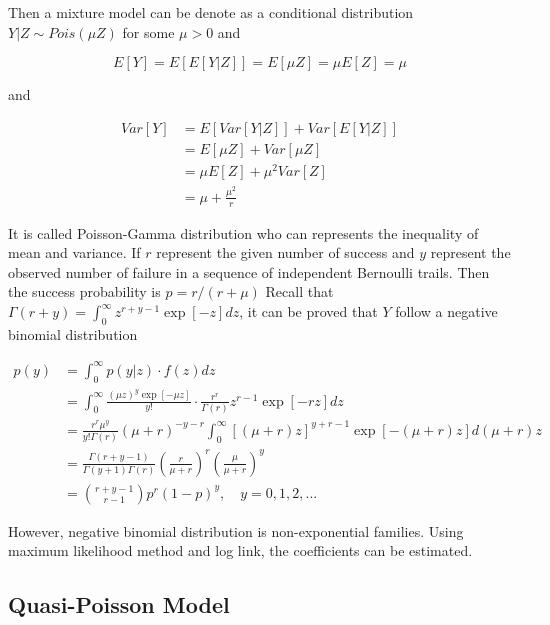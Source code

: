 \documentclass[
  11pt,
  openany]{memoir}
\begin{document}
Then a mixture model can be denote as a conditional distribution \(Y|Z\sim Pois(\mu Z)\) for some \(\mu>0\) and

\begin{equation}
E[Y]=E[E[Y|Z]]=E[\mu Z]=\mu E[Z]=\mu
\end{equation}

and

\begin{equation}
\begin{split}
Var[Y]&=E[Var[Y|Z]] + Var[E[Y|Z]]\\
&=E[\mu Z]+Var[\mu Z]\\
&=\mu E[Z] + \mu^2Var[Z]\\
&=\mu+\frac{\mu^2}{r}
\end{split}
\end{equation}

It is called Poisson-Gamma distribution who can represents the inequality of mean and variance.
If \(r\) represent the given number of success and \(y\) represent the observed number of failure in a sequence of independent Bernoulli trails. Then the success probability is \(p=r/(r+\mu)\)
Recall that \(\Gamma(r+y)=\int_0^\infty z^{r+y-1}\exp[-z]dz\), it can be proved that \(Y\) follow a negative binomial distribution

\begin{equation}
\begin{split}
p(y)&=\int_0^\infty p(y|z)\cdot f(z)dz\\
&=\int_0^\infty \frac{(\mu z)^y\exp[-\mu z]}{y!}\cdot\frac{r^r}{\Gamma(r)}z^{r-1}\exp[-rz]dz\\
&=\frac{r^r\mu^y}{y!\Gamma(r)}(\mu+r)^{-y-r}\int_0^\infty [(\mu+r)z]^{y+r-1}\exp[-(\mu+r)z]d(\mu+r)z\\
&=\frac{\Gamma(r+y-1)}{\Gamma(y+1)\Gamma(r)}(\frac{r}{\mu+r})^r(\frac{\mu}{\mu+r})^y\\
&={{r+y-1}\choose{r-1}}p^r(1-p)^y, \quad y=0,1,2,...
\end{split}
\end{equation}

However, negative binomial distribution is non-exponential families. Using maximum likelihood method and log link, the coefficients can be estimated.

\hypertarget{quasi-poisson-model}{%
\subsection{Quasi-Poisson Model}\label{quasi-poisson-model}}
\end{document}
